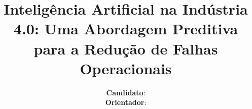 \documentclass[a4paper,12pt,onecolumn]{article}
\institute \\[0.8cm]
        {\huge \thetitle} \\[0.6cm]
\title{Inteligência Artificial na Indústria 4.0: Uma Abordagem Preditiva para a Redução de Falhas Operacionais}
\author{{\bf Candidato}: \candidate \\
        {\bf Orientador}: \advisor 
        }
\newif\ifadvice
\begin{document}
\ifadvice
\pagestyle{empty}
\begin{fapespadvice}

    O Projeto de Pesquisa~\cite{fapesp-guidelines} deve demonstrar claramente os desafios científicos ou técnicos a serem superados pela pesquisa  proposta, os meios e métodos para isso e a relevância dos resultados esperados para o avanço do conhecimento na área.
    Para facilitar a leitura pelos revisores, o texto deve ser redigido com espaçamento entre linhas de 1,5, fonte equivalente a Times New Roman ou Arial 12 e margens de 3 cm à esquerda e 1,5 cm à direita. As figuras e tabelas, se houver, devem ter uma legenda explicativa e devem ser numeradas para serem referenciadas no texto.

    Organização do projeto de pesquisa:

    \begin{itemize}

        \item Esta é apenas e tão somente uma recomendação – a aderência a ela não garante a aprovação do projeto.

        \item Sugere-se fortemente a leitura do formulário para parecer de assessoria científica, disponível em             \url{https://www.fapesp.br/595}, o qual esclarece quais pontos serão analisados pela assessoria consultada pela FAPESP.

        \item Recomenda-se que o projeto seja estruturado conforme roteiro a seguir.

        \item Sugere-se usar os títulos listados nos itens 1 a 7 abaixo,
            ocupando no máximo 20 páginas, como títulos de seções.
            Para facilitar a leitura pelos revisores, o texto deve ser redigido com espaçamento entre linhas de 1,5, fonte equivalente a Times New Roman ou Arial 12 e margens de 3 cm à esquerda e 1,5 cm à direita. As figuras e tabelas, se houver, devem ter uma legenda explicativa e devem ser numeradas para serem referenciadas no texto.

    \end{itemize}

\end{fapespadvice}
\clearpage
\fi


\clearpage
{}
\setcounter{page}{1}
\pagestyle{plain}
\renewcommand{\contentsname}{Sumário}
\tableofcontents
\end{document}
